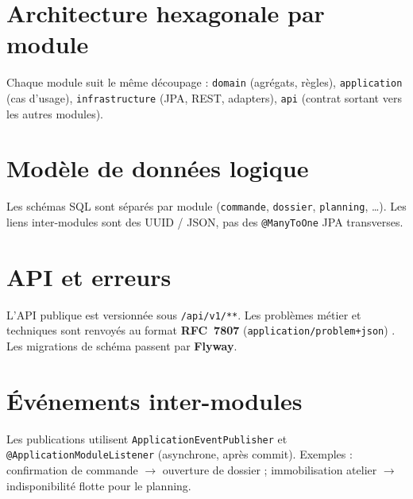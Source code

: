 \section{Architecture hexagonale par module}

Chaque module suit le même découpage : \texttt{domain} (agrégats, règles), \texttt{application} (cas d'usage), \texttt{infrastructure} (JPA, REST, adapters), \texttt{api} (contrat sortant vers les autres modules).


\section{Modèle de données logique}

Les schémas SQL sont séparés par module (\texttt{commande}, \texttt{dossier}, \texttt{planning}, \ldots). Les liens inter-modules sont des UUID / JSON, pas des \texttt{@ManyToOne} JPA transverses.


\section{API et erreurs}

L'API publique est versionnée sous \texttt{/api/v1/**}. Les problèmes métier et techniques sont renvoyés au format \textbf{RFC~7807} (\texttt{application/problem+json}) \cite{rfc7807}. Les migrations de schéma passent par \textbf{Flyway}.

\section{Événements inter-modules}

Les publications utilisent \texttt{ApplicationEventPublisher} et \texttt{@ApplicationModuleListener} (asynchrone, après commit). Exemples : confirmation de commande $\rightarrow$ ouverture de dossier ; immobilisation atelier $\rightarrow$ indisponibilité flotte pour le planning.
